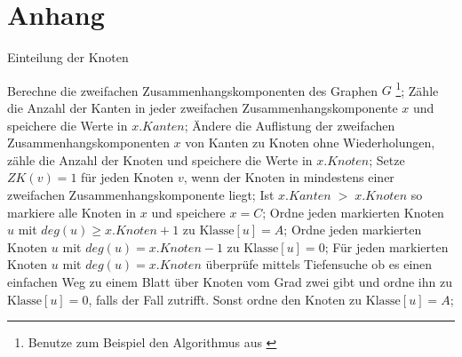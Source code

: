 \pagebreak


\clearpage


\thispagestyle{empty}
\clearpage
\thispagestyle{empty}
\listoffigures
\thispagestyle{empty}
\listoftables
\thispagestyle{empty}
\appendix
\chapter{Anhang}
\label{app}
\begin{algorithm}
\caption{Einteilung der Knoten}
\begin{algorithmic}[1]
\STATE Berechne die zweifachen Zusammenhangskomponenten des Graphen $G$ \footnote{Benutze zum Beispiel den Algorithmus aus \cite{Vorlesung}};
 \ENDIF
\STATE Zähle die Anzahl der Kanten in jeder zweifachen Zusammenhangskomponente $x$ und speichere die Werte in $x.Kanten$;
\STATE Ändere die Auflistung der zweifachen Zusammenhangskomponenten $x$ von Kanten zu Knoten ohne Wiederholungen, zähle die Anzahl der Knoten und speichere die Werte in $x.Knoten$;
\STATE Setze $ZK(v)=1$ für jeden Knoten $v$, wenn der Knoten in mindestens einer zweifachen Zusammenhangskomponente liegt;
\STATE Ist $x.Kanten\;>\;x.Knoten$ so markiere alle Knoten in $x$ und speichere $x=C$;
\STATE Ordne jeden markierten Knoten $u$ mit $deg(u) \geq x.Knoten+1$ zu $\text{Klasse}[u]=A$;
\STATE Ordne jeden markierten Knoten $u$ mit $deg(u) = x.Knoten-1$ zu $\text{Klasse}[u]=0$;
\STATE Für jeden markierten Knoten $u$ mit $deg(u) = x.Knoten$ überprüfe mittels Tiefensuche ob es einen einfachen Weg zu einem Blatt über Knoten vom Grad zwei gibt und ordne ihn zu $\text{Klasse}[u]=0$, falls der Fall zutrifft. Sonst ordne den Knoten zu $\text{Klasse}[u]=A$;\\
\ENDIF
{}
\ENDFOR
\end{algorithmic}
\label{algzweifachzus}
\end{algorithm}
